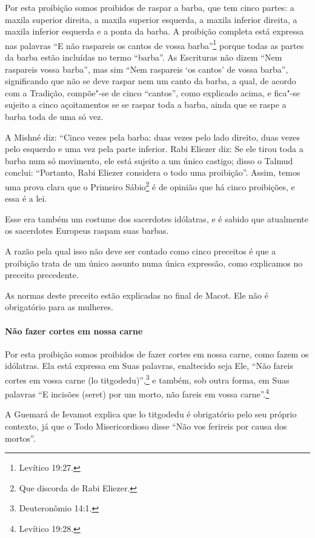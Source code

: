 \begin{multicols}{2}
Por esta proibição somos proibidos de raspar a barba, que tem cinco
partes: a maxila superior direita, a maxila superior esquerda, a maxila
inferior direita, a maxila inferior esquerda e a ponta da barba. A
proibição completa está expressa nas palavras ``E não raspareis os
cantos de vossa barba''\footnote{Levítico 19:27.} porque todas as partes da
barba estão incluídas no termo ``barba''. As Escrituras não dizem ``Nem
raspareis vossa barba'', mas sim ``Nem raspareis `os cantos' de vossa
barba'', significando que não se deve raspar nem um canto da barba, a
qual, de acordo com a Tradição, compõe"-se de cinco ``cantos'', como
explicado acima, e fica"-se sujeito a cinco açoitamentos se se raspar
toda a barba, ainda que se raspe a barba toda de uma só vez.

A Mishné diz: ``Cinco vezes pela barba: duas vezes pelo lado direito,
duas vezes pelo esquerdo e uma vez pela parte inferior. Rabi Eliezer\starr{}
diz: Se ele tirou toda a barba num só movimento, ele está sujeito a um
único castigo; disso o Talmud\starr{} conclui: ``Portanto, Rabi Eliezer\starr{}
considera o todo uma proibição''. Assim, temos uma prova clara que o
Primeiro Sábio\footnote{Que discorda de Rabi Eliezer\starr.} é de opinião que há cinco
proibições, e essa é a lei.

Esse era também um costume dos sacerdotes idólatras, e é sabido que
atualmente os sacerdotes Europeus raspam suas barbas.

A razão pela qual isso não deve ser contado como cinco preceitos é que a
proibição trata de um único assunto numa única expressão, como
explicamos no preceito precedente.

As normas deste preceito estão explicadas no final de Macot\starr. Ele não é
obrigatório para as mulheres.

\paragraph{Não fazer cortes em nossa carne}

Por esta proibição somos proibidos de fazer cortes em nossa carne, como
fazem os idólatras. Ela está expressa em Suas palavras, enaltecido seja
Ele, ``Não fareis cortes em vossa carne (lo titgodedu\starr)'',\footnote{Deuteronômio
14:1.} e também, sob outra forma, em Suas palavras ``E incisões (seret\starr)
por um morto, não fareis em vossa carne''.\footnote{Levítico 19:28.}

A Guemará\starr{} de Ievamot\starr{} explica que lo titgodedu\starr{} é obrigatório
pelo seu próprio contexto, já que o Todo Misericordioso disse ``Não vos
ferireis por causa dos mortos''.


\end{multicols}
